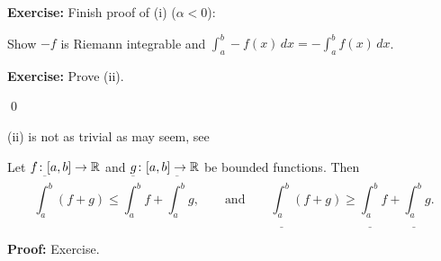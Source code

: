 \documentclass[10pt,aspectratio=169]{beamer}
\begin{document}
\begin{frame}

\textbf{Exercise:} Finish proof of (i) ($\alpha < 0$):

\pause
Show $-f$ is Riemann integrable and
$\int_a^b - f(x)\,dx =
-
\int_a^b f(x)\,dx$.

\pause
\medskip

\textbf{Exercise:} Prove (ii).

\medskip
\qed

\pause
\medskip

(ii) is not as trivial as may seem,
\pause
see

\begin{proposition}
Let $f \colon [a,b] \to {\mathbb{R}}$ and $g \colon [a,b] \to {\mathbb{R}}$ be bounded
functions.  Then
\begin{equation*}
\overline{\int_a^b} (f+g) \leq \overline{\int_a^b}f+\overline{\int_a^b}g
,
\qquad
\text{and}
\qquad
\underline{\int_a^b} (f+g) \geq \underline{\int_a^b}f+\underline{\int_a^b}g
.
\end{equation*}
\end{proposition}

\pause
\textbf{Proof:} Exercise.

\end{frame}
\end{document}
